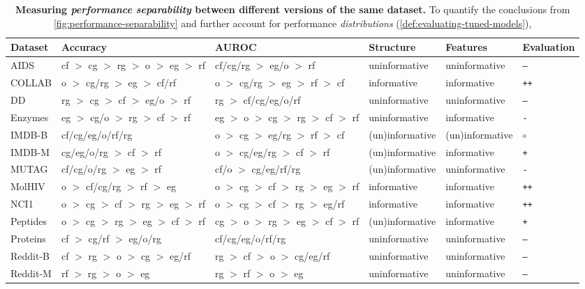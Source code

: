 \begin{table*}[!t]
	\centering \small
	\begin{tabular}{llllll}
\toprule
Dataset & Accuracy & AUROC & Structure & Features & Evaluation \\
\midrule
AIDS & cf $>$ cg $>$ rg $>$ o $>$ eg $>$ rf & cf/cg/rg $>$ eg/o $>$ rf & uninformative & uninformative & \texttt{--} \\
COLLAB & o $>$ cg/rg $>$ eg $>$ cf/rf & o $>$ cg/rg $>$ eg $>$ rf $>$ cf & informative & informative & \texttt{++} \\
DD & rg $>$ cg $>$ cf $>$ eg/o $>$ rf & rg $>$ cf/cg/eg/o/rf & uninformative & uninformative & \texttt{--} \\
Enzymes & eg $>$ cg/o $>$ rg $>$ cf $>$ rf & eg $>$ o $>$ cg $>$ rg $>$ cf $>$ rf & uninformative & informative & \texttt{-} \\
IMDB-B & cf/cg/eg/o/rf/rg & o $>$ cg $>$ eg/rg $>$ rf $>$ cf & (un)informative & (un)informative & $\circ$ \\
IMDB-M & cg/eg/o/rg $>$ cf $>$ rf & o $>$ cg/eg/rg $>$ cf $>$ rf & (un)informative & informative & \texttt{+} \\
MUTAG & cf/cg/o/rg $>$ eg $>$ rf & cf/o $>$ cg/eg/rf/rg & (un)informative & uninformative & \texttt{-} \\
MolHIV & o $>$ cf/cg/rg $>$ rf $>$ eg & o $>$ cg $>$ cf $>$ rg $>$ eg $>$ rf & informative & informative & \texttt{++} \\
NCI1 & o $>$ cg $>$ cf $>$ rg $>$ eg $>$ rf & o $>$ cg $>$ cf $>$ rg $>$ eg/rf & informative & informative & \texttt{++} \\
Peptides & o $>$ cg $>$ rg $>$ eg $>$ cf $>$ rf & cg $>$ o $>$ rg $>$ eg $>$ cf $>$ rf & (un)informative & informative & \texttt{+} \\
Proteins & cf $>$ cg/rf $>$ eg/o/rg & cf/cg/eg/o/rf/rg & uninformative & uninformative & \texttt{--} \\
Reddit-B & cf $>$ rg $>$ o $>$ cg $>$ eg/rf & rg $>$ cf $>$ o $>$ cg/eg/rf & uninformative & uninformative & \texttt{--} \\
Reddit-M & rf $>$ rg $>$ o $>$ eg & rg $>$ rf $>$ o $>$ eg & uninformative & uninformative & \texttt{--} \\
\bottomrule
\end{tabular}
 	\caption{\textbf{Measuring \emph{performance separability} between different versions of the same dataset.}
		To quantify the conclusions from \cref{fig:performance-separability} and further account for performance \emph{distributions} (\cref{def:evaluating-tuned-models}), 
}
\end{table*}
